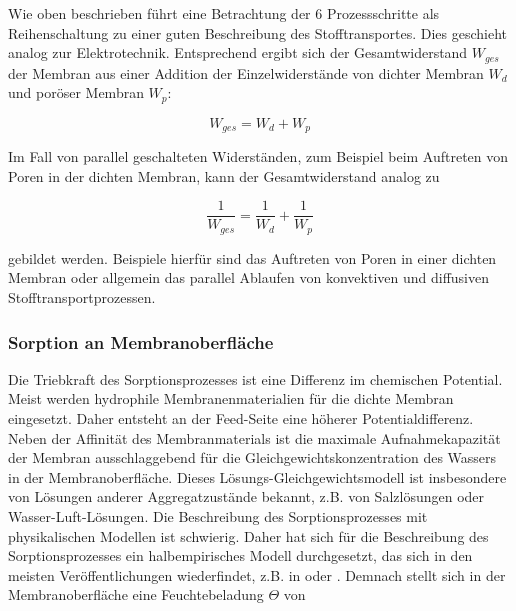 \begin{normalsize}
\begin{LARGE}
Wie oben beschrieben führt eine Betrachtung der 6 Prozessschritte als Reihenschaltung zu einer guten Beschreibung des Stofftransportes. Dies geschieht analog zur Elektrotechnik. Entsprechend ergibt sich der Gesamtwiderstand $W_{ges}$ der Membran aus einer Addition der Einzelwiderstände von dichter Membran $W_{d}$ und poröser Membran $W_{p}$:

\begin{equation}
 W_{ges} = W_{d} + W_{p}
\end{equation} 
 
Im Fall von parallel geschalteten Widerständen, zum Beispiel beim Auftreten von Poren in der dichten Membran, kann der Gesamtwiderstand analog zu 

\begin{equation}
\frac{1}{W_{ges}} = \frac{1}{W_{d}} + \frac{1}{W_{p}}
\end{equation}

gebildet werden. Beispiele hierfür sind das Auftreten von Poren in einer dichten Membran oder allgemein das parallel Ablaufen von konvektiven und diffusiven Stofftransportprozessen.


\subsubsection{Sorption an Membranoberfläche}
Die Triebkraft des Sorptionsprozesses ist eine Differenz im chemischen Potential. Meist werden hydrophile Membranenmaterialien für die dichte Membran eingesetzt. Daher entsteht an der Feed-Seite eine höherer Potentialdifferenz. Neben der Affinität des Membranmaterials ist die maximale Aufnahmekapazität der Membran ausschlaggebend für die Gleichgewichtskonzentration des Wassers in der Membranoberfläche. Dieses Lösungs-Gleichgewichtsmodell ist insbesondere von Lösungen anderer Aggregatzustände bekannt, z.B. von Salzlösungen oder Wasser-Luft-Lösungen. Die Beschreibung des Sorptionsprozesses mit physikalischen Modellen ist schwierig. Daher hat sich für die Beschreibung des Sorptionsprozesses ein halbempirisches Modell durchgesetzt, das sich in den meisten Veröffentlichungen wiederfindet, z.B. in \cite{J.L.Niu.2001} oder \cite{Dugaria.2015}. Demnach stellt sich in der Membranoberfläche eine Feuchtebeladung $\Theta$ von 


\end{LARGE}
\end{normalsize}
